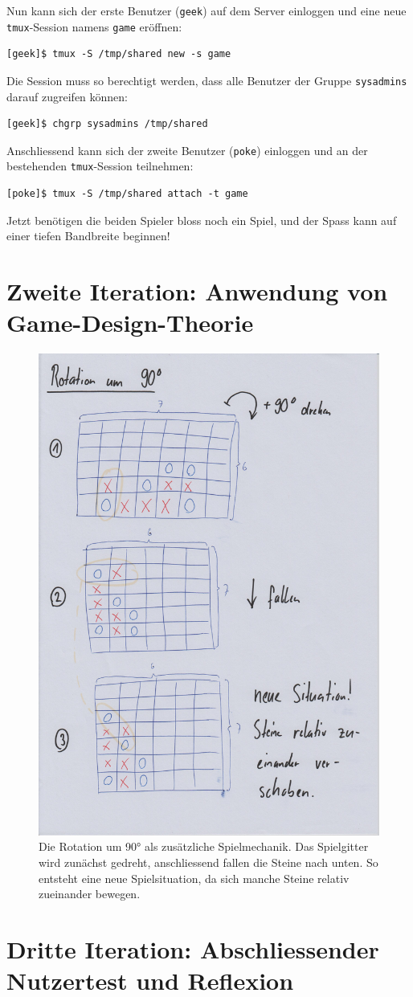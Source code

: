 \documentclass[a4paper,11pt,hidelinks]{scrartcl}
\begin{document}
Nun kann sich der erste Benutzer (\texttt{geek}) auf dem Server einloggen und eine neue \texttt{tmux}-Session namens \texttt{game} eröffnen:

\begin{lstlisting}
[geek]$ tmux -S /tmp/shared new -s game
\end{lstlisting}

Die Session muss so berechtigt werden, dass alle Benutzer der Gruppe \texttt{sysadmins} darauf zugreifen können:

\begin{lstlisting}
[geek]$ chgrp sysadmins /tmp/shared
\end{lstlisting}

Anschliessend kann sich der zweite Benutzer (\texttt{poke}) einloggen und an der bestehenden \texttt{tmux}-Session teilnehmen:

\begin{lstlisting}
[poke]$ tmux -S /tmp/shared attach -t game
\end{lstlisting}

Jetzt benötigen die beiden Spieler bloss noch ein Spiel, und der Spass kann auf einer tiefen Bandbreite beginnen!

\newpage

\section{Zweite Iteration: Anwendung von Game-Design-Theorie}
\newpage

\begin{figure}
    \centering
    \includegraphics[width=0.7\linewidth]{pics/rotation-papier.jpg}
    \caption{Die Rotation um 90° als zusätzliche Spielmechanik. Das Spielgitter wird zunächst gedreht, anschliessend fallen die Steine nach unten. So entsteht eine neue Spielsituation, da sich manche Steine relativ zueinander bewegen.}
\end{figure}

\section{Dritte Iteration: Abschliessender Nutzertest und Reflexion}
\newpage

\listoffigures
{}
\end{document}
